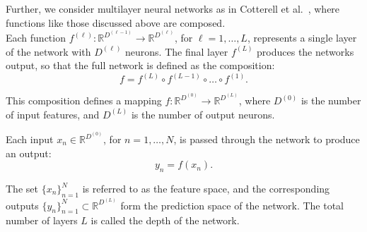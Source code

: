 Further, we consider multilayer neural networks as in Cotterell et al.~\cite{cotterell_formal_2024}, where functions like those discussed above are composed.\\


Each function \( f^{(\ell)} : \mathbb{R}^{D^{(\ell-1)}} \rightarrow \mathbb{R}^{D^{(\ell)}} \), for \( \ell = 1, \dots, L \), represents a single layer of the network with \( D^{(\ell)} \) neurons.
The final layer \( f^{(L)} \) produces the networks output, so that the full network is defined as the composition:
\[
f = f^{(L)} \circ f^{(L-1)} \circ \dots \circ f^{(1)}.
\]

This composition defines a mapping \( f: \mathbb{R}^{D^{(0)}} \rightarrow \mathbb{R}^{D^{(L)}} \), where \(D^{(0)} \) is the number of input features, and \( D^{(L)} \) is the number of output neurons.

Each input \( x_n \in \mathbb{R}^{D^{(0)}} \), for \( n = 1, \dots, N \), is passed through the network to produce an output:
\[
y_n = f(x_n).
\]

The set \( \{ x_n \}_{n=1}^N \) is referred to as the feature space, and the corresponding outputs \( \{y_n \}_{n=1}^N \subset \mathbb{R}^{D^{(L)}} \) form the prediction space of the network. The total number of layers \( L \) is called the depth of the network.
